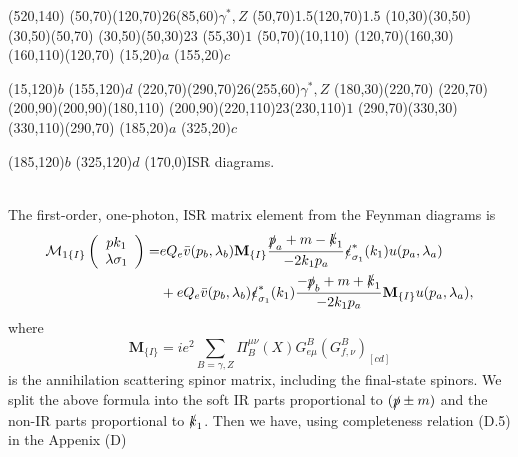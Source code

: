 \begin{axopicture}(520,140)
	\Photon(50,70)(120,70){2}{6}\Text(85,60){$\gamma^\ast,Z$}
	\Vertex(50,70){1.5}\Vertex(120,70){1.5}
	\Line[arrow](10,30)(30,50)\Line[arrow](30,50)(50,70)
	\Photon(30,50)(50,30){2}{3} \Text(55,30){$1$}
	\Line[arrow](50,70)(10,110)
	\Line[arrow](120,70)(160,30)
	\Line[arrow](160,110)(120,70)
	\Text(15,20){$a$}
	\Text(155,20){$c$}
	
	\Text(15,120){$b$}
	\Text(155,120){$d$}
	\Photon(220,70)(290,70){2}{6}\Text(255,60){$\gamma^\ast,Z$}
	\Line[arrow](180,30)(220,70)
	\Line[arrow](220,70)(200,90)\Line[arrow](200,90)(180,110)
	\Photon(200,90)(220,110){2}{3}\Text(230,110){$1$}
	\Line[arrow](290,70)(330,30)
	\Line[arrow](330,110)(290,70)
	\Text(185,20){$a$}
	\Text(325,20){$c$}
	
	\Text(185,120){$b$}
	\Text(325,120){$d$}
	\Text(170,0){ISR diagrams.}
\end{axopicture}
\\ \newline \newline
The first-order, one-photon, ISR matrix element from the Feynman diagrams is
\begin{align}
\mathcal{M}_{1\{I\}}\left(\begin{array}{c}
pk_1\\\lambda\sigma_1
\end{array}\right)
=&eQ_e\bar{v}(p_b,\lambda_b)\mathbf{M}_{\{I\}}\frac{\slashed p_a+m-\slashed k_1}{-2k_1p_a}\slashed \epsilon^\ast_{\sigma_1}(k_1)u(p_a,\lambda_a)\nonumber\\
&+eQ_e\bar{v}(p_b,\lambda_b)\slashed \epsilon^\ast_{\sigma_1}(k_1)\frac{-\slashed p_b+m+\slashed k_1}{-2k_1p_a}\mathbf{M}_{\{I\}}u(p_a,\lambda_a),\nonumber\\
\end{align}
where
\begin{equation}
\mathbf{M}_{\{I\}}=ie^2\sum_{B=\gamma,Z}\Pi_{B}^{\mu\nu}(X)G^B_{e\mu}(G^B_{f,\nu})_{[cd]}
\end{equation}
is the annihilation scattering spinor matrix, including the final-state spinors. We split the above formula into the soft IR parts proportional to $(\slashed p\pm m)$ and the non-IR parts proportional to $\slashed k_1$. Then we have, using completeness relation (D.5) in the Appenix (D)
